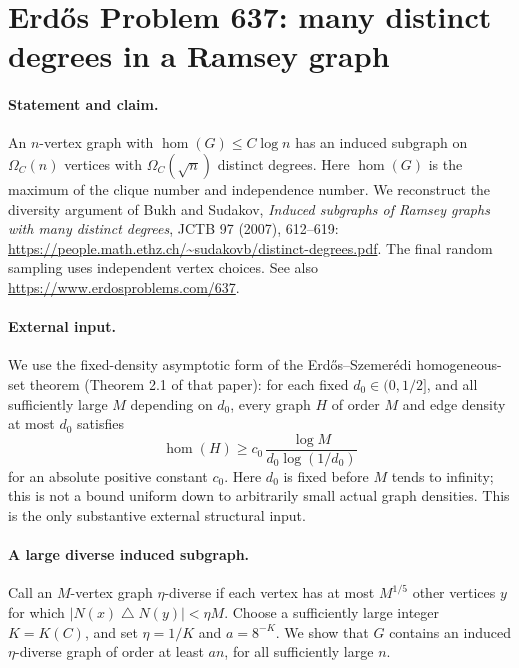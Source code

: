 \section*{Erd\H{o}s Problem 637: many distinct degrees in a Ramsey graph}

\paragraph{Statement and claim.}
An \(n\)-vertex graph with
\(\operatorname{hom}(G)\leq C\log n\) has an induced subgraph on
\(\Omega_C(n)\) vertices with \(\Omega_C(\sqrt n)\) distinct degrees.
Here \(\operatorname{hom}(G)\) is the maximum of the clique number
and independence number.
We reconstruct the diversity argument of Bukh and Sudakov,
\emph{Induced subgraphs of Ramsey graphs with many distinct degrees},
JCTB 97 (2007), 612--619:
\url{https://people.math.ethz.ch/~sudakovb/distinct-degrees.pdf}.
The final random sampling uses independent vertex choices.
See also \url{https://www.erdosproblems.com/637}.

\paragraph{External input.}
We use the fixed-density asymptotic form of the
Erd\H{o}s--Szemer\'edi homogeneous-set theorem (Theorem 2.1 of
that paper): for each fixed \(d_0\in(0,1/2]\), and all sufficiently
large \(M\) depending on \(d_0\), every graph \(H\) of order \(M\)
and edge density at most \(d_0\) satisfies
\[
 \operatorname{hom}(H)\geq
 c_0\,\frac{\log M}{d_0\log(1/d_0)}
\]
for an absolute positive constant \(c_0\).
Here \(d_0\) is fixed before \(M\) tends to infinity; this is not
a bound uniform down to arbitrarily small actual graph densities.
This is the only substantive external structural input.

\paragraph{A large diverse induced subgraph.}
Call an \(M\)-vertex graph \(\eta\)-diverse if each vertex has at most
\(M^{1/5}\) other vertices \(y\) for which
\(|N(x)\mathbin{\triangle}N(y)|<\eta M\).
Choose a sufficiently large integer \(K=K(C)\), and set
\(\eta=1/K\) and \(a=8^{-K}\).
We show that \(G\) contains an induced \(\eta\)-diverse graph of order
at least \(an\), for all sufficiently large \(n\).

